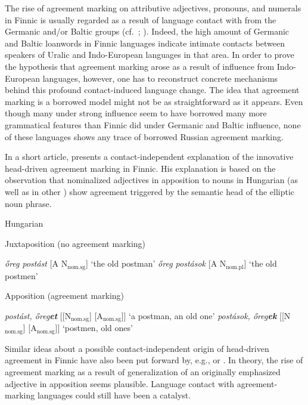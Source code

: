 {The rise of agreement marking on attributive adjectives, pronouns, and numerals in Finnic is usually regarded as a result of language contact with  from the Germanic and/or Baltic groups (cf.~\citealt[25]{tauli1955}; \citealt{hajdu1996}). Indeed, the high amount of Germanic and Baltic loanwords in Finnic languages indicate intimate contacts between speakers of Uralic and Indo-European languages in that area. In order to prove the hypothesis that agreement marking arose as a result of influence from Indo-European languages, however, one has to reconstruct concrete mechanisms behind this profound contact-induced language change. The idea that agreement marking is a borrowed model might not be as straightforward as it appears. Even though many  under strong  influence seem to have borrowed many more grammatical features than Finnic did under Germanic and Baltic influence, none of these languages shows any trace of borrowed Russian agreement marking.

In a short article, \citet{mark1979} presents a contact-independent explanation of the innovative head\hyp{}driven agreement marking in Finnic. His explanation is based on the observation that nominalized adjectives in apposition to nouns in Hungarian (as well as in other ) show agreement triggered by the semantic head of the elliptic noun phrase.
\begin{exe} \label{hung ap}
\ex \rm{Hungarian \citep[209]{mark1979}}
\begin{xlist}
\ex \rm{Juxtaposition (no agreement marking)}
\begin{xlist}
\ex \textit{őreg postást} 		\rm{[A N$_{\text{nom.sg}}$] ‘the old postman’}
\ex \textit{őreg postások} 		\rm{[A N$_{\text{nom.pl}}$] ‘the old postmen’}
\end{xlist}
\ex \rm{Apposition (agreement marking)}
\begin{xlist}
\ex \textit{postást, őreg\textbf{et}} 	\rm{[[N$_{\text{nom.sg}}$] [A$_{\text{nom.sg}}$]] ‘a postman, an old one’}
\ex \textit{postások, őreg\textbf{ek}} 	\rm{[[N$_{\text{nom.sg}}$] [A$_{\text{nom.sg}}$]] ‘postmen, old ones’}
\end{xlist}
\end{xlist}
\end{exe}
Similar ideas about a possible contact-independent origin of head\hyp{}driven agreement in Finnic have also been put forward by, e.g., \cite{ravila1941} or \cite{papp1962}. In theory, the rise of agreement marking as a result of generalization of an originally emphasized adjective in apposition seems plausible. Language contact with agreement-marking languages could still have been a catalyst. 

}

